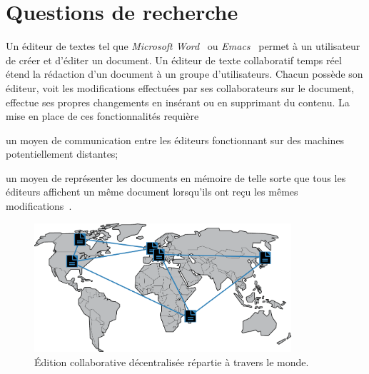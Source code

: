 
\section{Questions de recherche}

Un éditeur de textes tel que \emph{Microsoft Word}~\cite{word} ou
\emph{Emacs}~\cite{emacs} permet à un utilisateur de créer et d'éditer un
document. Un éditeur de texte collaboratif temps réel~\cite{ellis1991groupware}
étend la rédaction d'un document à un groupe d'utilisateurs. Chacun possède son
éditeur, voit les modifications effectuées par ses collaborateurs sur le
document, effectue ses propres changements en insérant ou en supprimant du
contenu. La mise en place de ces fonctionnalités requière
\begin{inparaenum}[(i)]
\item un moyen de communication entre les éditeurs fonctionnant sur des machines
  potentiellement distantes;
\item un moyen de représenter les documents en mémoire de telle sorte que tous
  les éditeurs affichent un même document lorsqu'ils ont reçu les mêmes
  modifications~\cite{burckhardt2014replicated, shapiro2011conflict}.
\end{inparaenum}

\begin{figure}
  \begin{center}
    \includegraphics[width=0.85\textwidth]{img/world.png}
    \caption[Édition collaborative décentralisée]{\label{intro:img:world}Édition
      collaborative décentralisée répartie à travers le monde.}
  \end{center}
\end{figure}

